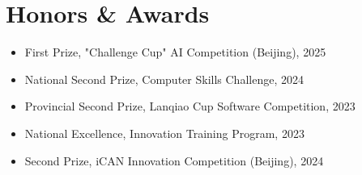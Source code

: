 \documentclass[10pt]{resume}
\begin{document}
\section{Honors \& Awards}
\begin{itemize}[parsep=0.1ex, leftmargin=1.2pc]
  \item First Prize, "Challenge Cup" AI Competition (Beijing), 2025
  \item National Second Prize, Computer Skills Challenge, 2024
  \item Provincial Second Prize, Lanqiao Cup Software Competition, 2023
  \item National Excellence, Innovation Training Program, 2023
  \item Second Prize, iCAN Innovation Competition (Beijing), 2024
\end{itemize}
\end{document}
